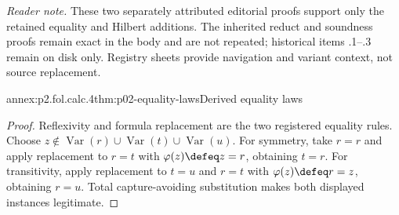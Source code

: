 \noindent\textit{Reader note.} These two separately attributed editorial proofs
support only the retained equality and Hilbert additions.  The inherited
reduct and soundness proofs remain exact in the body and are not repeated;
historical items .1--.3 remain on disk only.  Registry sheets provide
navigation and variant context, not source replacement.

\begin{annexitem}{annex:p2.fol.calc.4}{thm:p02-equality-laws}{Derived equality laws}
\begin{proof}
Reflexivity and formula replacement are the two registered equality rules.
Choose \(z\notin
\operatorname{Var}(r)\cup\operatorname{Var}(t)\cup\operatorname{Var}(u)\).
For symmetry, take \(r=r\) and apply replacement to \(r=t\) with
\(\varphi(z)\defeq z=r\), obtaining \(t=r\).  For transitivity, apply
replacement to \(t=u\) and \(r=t\) with
\(\varphi(z)\defeq r=z\), obtaining \(r=u\).  Total capture-avoiding
substitution makes both displayed instances legitimate.
\end{proof}
\end{annexitem}

